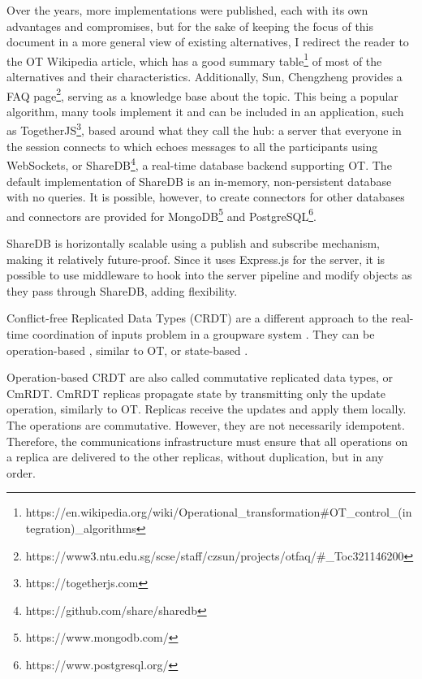 Over the years, more implementations were published, each with its own advantages and compromises, but for the sake of keeping the focus of this document in a more general view of existing alternatives, I redirect the reader to the OT Wikipedia article, which has a good summary table\footnote{https://en.wikipedia.org/wiki/Operational\_transformation\#OT\_control\_(integration)\_algorithms} of most of the alternatives and their characteristics. Additionally, Sun, Chengzheng provides a FAQ page\footnote{https://www3.ntu.edu.sg/scse/staff/czsun/projects/otfaq/\#\_Toc321146200}, serving as a knowledge base about the topic. This being a popular algorithm, many tools implement it and can be included in an application, such as TogetherJS\footnote{https://togetherjs.com}, based around what they call the hub: a server that everyone in the session connects to which echoes messages to all the participants using WebSockets, or ShareDB\footnote{https://github.com/share/sharedb}, a real-time database backend supporting OT. The default implementation of ShareDB is an in-memory, non-persistent database with no queries. It is possible, however, to create connectors for other databases and connectors are provided for MongoDB\footnote{https://www.mongodb.com/} and PostgreSQL\footnote{https://www.postgresql.org/}.

ShareDB is horizontally scalable using a publish and subscribe mechanism, making it relatively future-proof. Since it uses Express.js for the server, it is possible to use middleware to hook into the server pipeline and modify objects as they pass through ShareDB, adding flexibility.

Conflict-free Replicated Data Types (CRDT) are a different approach to the real-time coordination of inputs problem in a groupware system \cite{Shapiro2011}. They can be operation-based \cite{Letia2010} \cite{Baquero2014}, similar to OT, or state-based \cite{Baquero1999} \cite{Almeida2014}.

Operation-based CRDT are also called commutative replicated data types, or CmRDT. CmRDT replicas propagate state by transmitting only the update operation, similarly to OT. Replicas receive the updates and apply them locally. The operations are commutative. However, they are not necessarily idempotent. Therefore, the communications infrastructure must ensure that all operations on a replica are delivered to the other replicas, without duplication, but in any order.

